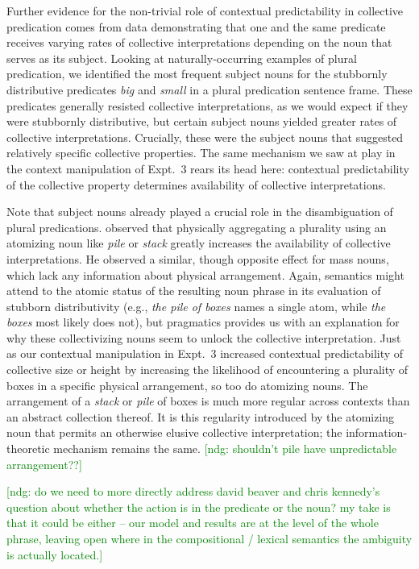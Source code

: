 \documentclass[linguex]{sp}
\newcommand{\ndg}[1]{\textcolor{Green}{[ndg: #1]}}
\begin{document}
Further evidence for the non-trivial role of contextual predictability in collective predication comes from data demonstrating that one and the same predicate receives varying rates of collective interpretations depending on the noun that serves as its subject. Looking at naturally-occurring examples of plural predication, we identified the most frequent subject nouns for the stubbornly distributive predicates \emph{big} and \emph{small} in a plural predication sentence frame. These predicates generally resisted collective interpretations, as we would expect if they were stubbornly distributive, but certain subject nouns yielded greater rates of collective interpretations. Crucially, these were the subject nouns that suggested relatively specific collective properties. 
The same mechanism we saw at play in the context manipulation of Expt.~3 rears its head here: contextual predictability of the collective property determines availability of collective interpretations.

Note that subject nouns already played a crucial role in the disambiguation of plural predications. \cite{schwarzschild2011} observed that physically aggregating a plurality using an atomizing noun like \emph{pile} or \emph{stack} greatly increases the availability of collective interpretations. He observed a similar, though opposite effect for mass nouns, which lack any information about physical arrangement. Again, semantics might attend to the atomic status of the resulting noun phrase in its evaluation of stubborn distributivity (e.g., \emph{the pile of boxes} names a single atom, while \emph{the boxes} most likely does not), but pragmatics provides us with an explanation for why these collectivizing nouns seem to unlock the collective interpretation. Just as our contextual manipulation in Expt.~3 increased contextual predictability of collective size or height by increasing the likelihood of encountering a plurality of boxes in a specific physical arrangement, so too do atomizing nouns. The arrangement of a \emph{stack} or \emph{pile} of boxes is much more regular across contexts than an abstract collection thereof. It is this regularity introduced by the atomizing noun that permits an otherwise elusive collective interpretation; the information-theoretic mechanism remains the same.
\ndg{shouldn't pile have unpredictable arrangement??}

\ndg{do we need to more directly address david beaver and chris kennedy's question about whether the action is in the predicate or the noun? my take is that it could be either -- our model and results are at the level of the whole phrase, leaving open where in the compositional / lexical semantics the ambiguity is actually located.}
\end{document}
